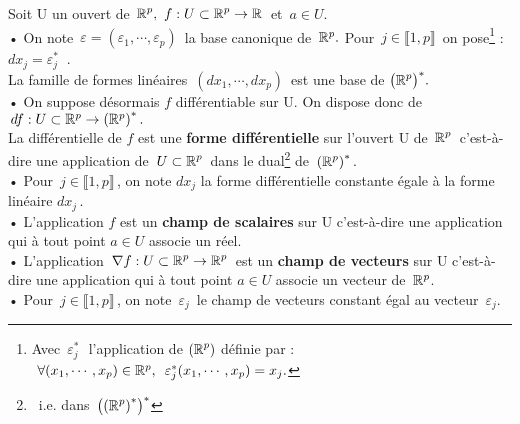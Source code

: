 Soit U un ouvert de \(\displaystyle\,\RR^p,\ f:U\subset \RR^p\to \RR\,\) et \(\,a\in U\).\vspace{0.1cm}\\
• On note \(\,\varepsilon=(\varepsilon_1,\cdots,\varepsilon_p)\,\) la base canonique de \(\,\mathbb{R}^p.\) Pour \(\,j\in \llbracket 1,p \rrbracket\,\) on pose\footnote{Avec $\,\varepsilon_j^*\,\,$ l'application de $\displaystyle\left(\mathbb{R}^p\right)$\expo{*} définie par : \(\ \forall (x_1,\cdots,x_p)\in \mathbb{R}^p,\ \, \varepsilon_j^*(x_1,\cdots,x_p)=x_j.\)\vspace{0.2cm}} : \(dx_j=\varepsilon_j^*\ \) .\vspace{0.1cm}\\
La famille de formes linéaires \(\,(dx_1,\cdots,dx_p)\,\) est une base de \(\displaystyle \bigl(\mathbb{R}^p\bigr)^*.\)\vspace{0.2cm}\\
• On suppose désormais $f$ différentiable sur U. On dispose donc de \(\,df:U\subset\mathbb{R}^p \to \left(\mathbb{R}^p \right)^*.\,\)\\
La différentielle de $f$ est une \textbf{forme différentielle} sur l'ouvert U de $\displaystyle\,\mathbb{R}^p\,$ c'est-à-dire une application de \(\displaystyle \,U\subset \mathbb{R}^p\,\) dans le dual\footnote{\ i.e. dans \(\displaystyle\,\left(\left(\mathbb{R}^p\right)^*\right)^*\)} de \(\displaystyle\,\left(\mathbb{R}^p\right)^*.\)\vspace{0.2cm}\\
• Pour \(\, j\in \llbracket 1,p \rrbracket\,\), on note $dx_j$ la forme différentielle constante égale à la forme linéaire $dx_j\,$.\vspace{0.2cm}\\
• L'application $f$ est un \textbf{champ de scalaires} sur U c'est-à-dire une application qui à tout point \(a\in U\) associe un réel.\vspace{0.2cm}\\
• L'application \(\displaystyle\,\nabla f:U\subset \mathbb{R}^p\to \mathbb{R}^p\,\) est un \textbf{champ de vecteurs} sur U c'est-à-dire une application qui à tout point \(a\in U\) associe un vecteur de \(\,\mathbb{R}^p\).\vspace{0.1cm}\\
• Pour \(\, j\in \llbracket 1,p \rrbracket\,\), on note $\,\varepsilon_j\,$ le champ de vecteurs constant égal au vecteur $\,\varepsilon_j$.

\vspace{1.5cm}


